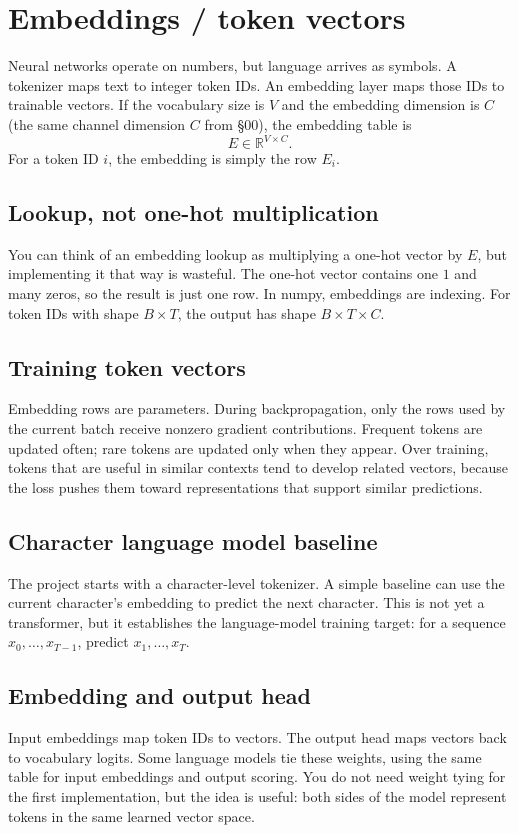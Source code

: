 \section{Embeddings / token vectors}\label{sec:07}

Neural networks operate on numbers, but language arrives as symbols. A tokenizer
maps text to integer token IDs. An embedding layer maps those IDs to trainable
vectors. If the vocabulary size is $V$ and the embedding dimension is $C$ (the same
channel dimension $C$ from \S00), the embedding table is
\[
  E \in \mathbb{R}^{V \times C}.
\]
For a token ID $i$, the embedding is simply the row $E_i$.

\subsection*{Lookup, not one-hot multiplication}
You can think of an embedding lookup as multiplying a one-hot vector by $E$, but
implementing it that way is wasteful. The one-hot vector contains one $1$ and
many zeros, so the result is just one row. In numpy, embeddings are indexing.
For token IDs with shape $B \times T$, the output has shape
$B \times T \times C$.

\subsection*{Training token vectors}
Embedding rows are parameters. During backpropagation, only the rows used by the
current batch receive nonzero gradient contributions. Frequent tokens are
updated often; rare tokens are updated only when they appear. Over training,
tokens that are useful in similar contexts tend to develop related vectors,
because the loss pushes them toward representations that support similar
predictions.

\subsection*{Character language model baseline}
The project starts with a character-level tokenizer. A simple baseline can use
the current character's embedding to predict the next character. This is not yet
a transformer, but it establishes the language-model training target: for a
sequence $x_0,\dots,x_{T-1}$, predict $x_1,\dots,x_T$.

\subsection*{Embedding and output head}
Input embeddings map token IDs to vectors. The output head maps vectors back to
vocabulary logits. Some language models tie these weights, using the same table
for input embeddings and output scoring. You do not need weight tying for the
first implementation, but the idea is useful: both sides of the model represent
tokens in the same learned vector space.

